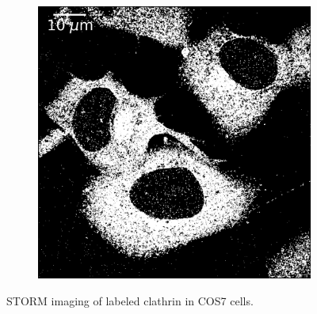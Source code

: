 \begin{figure}
\begin{subfigure}{0.49\textwidth}
        \includegraphics[width=\textwidth]{figures/clathrin_image2.png}
        \caption{}
        \label{fig:clathrin_image6}
    \end{subfigure}
    \caption{STORM imaging of labeled clathrin in COS7 cells.}
    \label{fig:clathrin_images}
\end{figure}